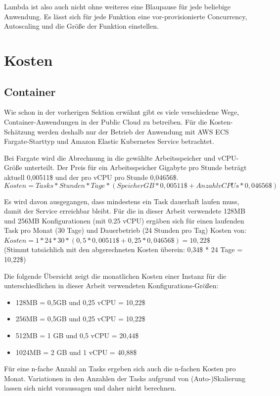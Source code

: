 Lambda ist also auch nicht ohne weiteres eine Blaupause für jede beliebige Anwendung. Es lässt sich für jede Funktion eine vor-provisionierte Concurrency, Autoscaling und die Größe der Funktion einstellen.

\section{Kosten}

\subsection{Container}
Wie schon in der vorherigen Sektion erwähnt gibt es viele verschiedene Wege, Container-Anwendungen in der Public Cloud zu betreiben. Für die Kosten-Schätzung werden deshalb nur der Betrieb der Anwendung mit AWS ECS Fargate-Starttyp und Amazon Elastic Kubernetes Service betrachtet.

Bei Fargate wird die Abrechnung in die gewählte Arbeitsspeicher und vCPU-Größe unterteilt. Der Preis für ein Arbeitsspeicher Gigabyte pro Stunde beträgt aktuell 0,00511\$ und der pro vCPU pro Stunde 0,04656\$.  \\


\begin{equation}
Kosten = Tasks * Stunden * Tage * (SpeicherGB * 0,00511\$ + AnzahlvCPUs * 0,04656\$)
\end{equation}

Es wird davon ausgegangen, dass mindestens ein Task dauerhaft laufen muss, damit der Service erreichbar bleibt. Für die in dieser Arbeit verwendete 128MB und 256MB Konfigurationen (mit 0.25 vCPU) ergäben sich für einen laufenden Task pro Monat (30 Tage) und Dauerbetrieb (24 Stunden pro Tag) Kosten von: \\

$Kosten = 1 * 24 * 30 * (0,5 * 0,00511\$ + 0,25 * 0,04656\$) = 10,22\$$ \\
(Stimmt tatsächlich mit den abgerechneten Kosten überein: 0,34\$ * 24 Tage = 10,22\$)

Die folgende Übersicht zeigt die monatlichen Kosten einer Instanz für die unterschiedlichen in dieser Arbeit verwendeten Konfigurations-Größen:

\begin{itemize}
    \item 128MB = 0,5GB und 0,25 vCPU = 10,22\$
    \item 256MB = 0,5GB und 0,25 vCPU = 10,22\$
    \item 512MB = 1  GB und 0,5  vCPU = 20,44\$
    \item 1024MB = 2 GB und 1    vCPU = 40,88\$
\end{itemize}
Für eine n-fache Anzahl an Tasks ergeben sich auch die n-fachen Kosten pro Monat. Variationen in den Anzahlen der Tasks aufgrund von (Auto-)Skalierung lassen sich nicht voraussagen und daher nicht berechnen.


